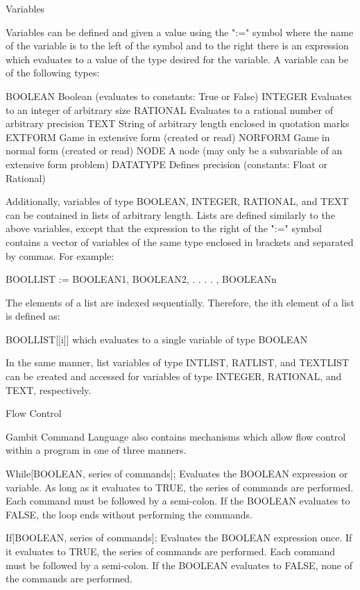 Variables

Variables can be defined and given a value using the ":=" symbol where the name
of the variable is to the left of the symbol and to the right there is an
expression which evaluates to a value of the type desired for the variable.
A variable can be of the following types:

	BOOLEAN		Boolean (evaluates to constants:  True or False)
	INTEGER		Evaluates to an integer of arbitrary size
	RATIONAL	Evaluates to a rational number of arbitrary precision
	TEXT		String of arbitrary length enclosed in quotation marks
	EXTFORM		Game in extensive form (created or read)
	NORFORM		Game in normal form (created or read)
	NODE		A node (may only be a subvariable of an extensive form
			problem)
	DATATYPE	Defines precision (constants:  Float or Rational)

Additionally, variables of type BOOLEAN, INTEGER, RATIONAL, and TEXT can be 
contained in lists of arbitrary length.  Lists are defined similarly to the 
above variables, except that the expression to the right of the ":=" symbol
contains a vector of variables of the same type enclosed in brackets and
separated by commas.  For example:

	BOOLLIST := { BOOLEAN1, BOOLEAN2, . . . . , BOOLEANn }

The elements of a list are indexed sequentially.  Therefore, the ith element of
a list is defined as:

	BOOLLIST[[i]]	which evaluates to a single variable of type BOOLEAN

In the same manner, list variables of type INTLIST, RATLIST, and TEXTLIST can
be created and accessed for variables of type INTEGER, RATIONAL, and TEXT, 
respectively.


Flow Control

Gambit Command Language also contains mechanisms which allow flow control 
within a program in one of three manners.

While[BOOLEAN, {series of commands}];	Evaluates the BOOLEAN expression or
					variable.  As long as it evaluates to
					TRUE, the series of commands are 
					performed.  Each command must be 
					followed by a semi-colon.  If the
					BOOLEAN evaluates to FALSE, the loop
					ends without performing the commands.

If[BOOLEAN, {series of commands}];	Evaluates the BOOLEAN expression once.
					If it evaluates to TRUE, the series of
					commands are performed.  Each command
					must be followed by a semi-colon.  If
					the BOOLEAN evaluates to FALSE, none
					of the commands are performed.

